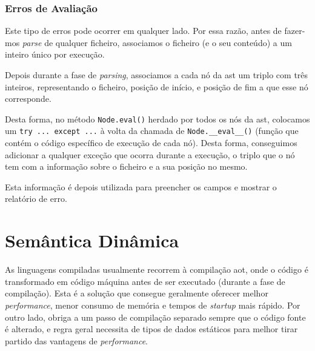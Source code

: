 \subsubsection*{Erros de Avaliação}
Este tipo de erros pode ocorrer em qualquer lado. Por essa razão, antes de fazer-mos \textit{parse} de qualquer ficheiro, associamos o ficheiro (e o seu conteúdo) a um inteiro único por execução. 

Depois durante a fase de \textit{parsing}, associamos a cada nó da \acrshort{ast} um triplo com três inteiros, representando o ficheiro, posição de início, e posição de fim a que esse nó corresponde.

Desta forma, no método \texttt{Node.eval()} herdado por todos os nós da \acrshort{ast}, colocamos um \texttt{try ... except ...} à volta da chamada de \texttt{Node.\_\_eval\_\_()} (função que contém o código específico de execução de cada nó). Desta forma, conseguimos adicionar a qualquer exceção que ocorra durante a execução, o triplo que o nó tem com a informação sobre o ficheiro e a sua posição no mesmo.

Esta informação é depois utilizada para preencher os campos e mostrar o relatório de erro.

\newpage

\section{Semântica Dinâmica}
As linguagens compiladas usualmente recorrem à compilação \acrfull{aot}, onde o código é transformado em código máquina antes de ser executado (durante a fase de compilação). Esta é a solução que consegue geralmente oferecer melhor \textit{performance}, menor consumo de memória e tempos de \textit{startup} mais rápido. Por outro lado, obriga a um passo de compilação separado sempre que o código fonte é alterado, e regra geral necessita de tipos de dados estáticos para melhor tirar partido das vantagens de \textit{performance}.

